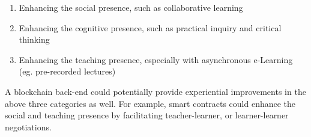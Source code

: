 \begin{enumerate}
    \setlength\itemsep{0em}    
    \item Enhancing the social presence, such as collaborative learning
    \item Enhancing the cognitive presence, such as practical inquiry and critical thinking
    \item Enhancing the teaching presence, especially with asynchronous e-Learning (eg. pre-recorded lectures)
\end{enumerate}

A blockchain back-end could potentially provide experiential improvements in the above three categories as well. 
For example, smart contracts could enhance the social and teaching presence by facilitating teacher-learner, or 
learner-learner negotiations.




